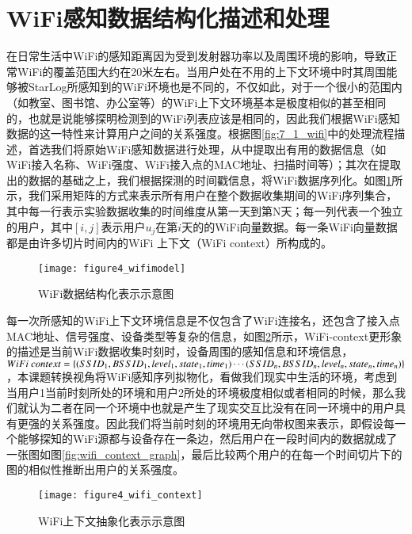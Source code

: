 \section{WiFi感知数据结构化描述和处理}
\label{wifi_pro_tec}
在日常生活中WiFi的感知距离因为受到发射器功率以及周围环境的影响，导致正常WiFi的覆盖范围大约在20米左右。当用户处在不用的上下文环境中时其周围能够被StarLog所感知到的WiFi环境也是不同的，不仅如此，对于一个很小的范围内（如教室、图书馆、办公室等）的WiFi上下文环境基本是极度相似的甚至相同的，也就是说能够探明检测到的WiFi列表应该是相同的，因此我们根据WiFi感知数据的这一特性来计算用户之间的关系强度。根据图\ref{fig:7_1_wifi}中的处理流程描述，首选我们将原始WiFi感知数据进行处理，从中提取出有用的数据信息（如WiFi接入名称、WiFi强度、WiFi接入点的MAC地址、扫描时间等）；其次在提取出的数据的基础之上，我们根据探测的时间戳信息，将WiFi数据序列化。如图\ref{fig:wifimodel_process}所示，我们采用矩阵的方式来表示所有用户在整个数据收集期间的WiFi序列集合，其中每一行表示实验数据收集的时间维度从第一天到第N天；每一列代表一个独立的用户，其中$[i,j]$表示用户$u_{j}$在第$i$天的的WiFi向量数据。每一条WiFi向量数据都是由许多切片时间内的WiFi 上下文（WiFi context）所构成的。
\begin{figure}[htp]
\centering
\texttt{[image: figure4\_wifimodel]}
\caption{WiFi数据结构化表示示意图}
\label{fig:wifimodel_process}
\end{figure}
\par 每一次所感知的WiFi上下文环境信息是不仅包含了WiFi连接名，还包含了接入点MAC地址、信号强度、设备类型等复杂的信息，如图\ref{fig:wifi_context}所示，WiFi-context更形象的描述是当前WiFi数据收集时刻时，设备周围的感知信息和环境信息， $WiFi \ context= \{ (SSID_{1},BSSID_{1},level_{1},state_{1},time_{1}) \cdots  (SSID_{n},BSSID_{n},level_{n}, \\ state_{n},time_{n}) \}$，本课题转换视角将WiFi感知序列拟物化，看做我们现实中生活的环境，考虑到当用户1当前时刻所处的环境和用户2所处的环境极度相似或者相同的时候，那么我们就认为二者在同一个环境中也就是产生了现实交互比没有在同一环境中的用户具有更强的关系强度。因此我们将当前时刻的环境用无向带权图来表示，即假设每一个能够探知的WiFi源都与设备存在一条边，然后用户在一段时间内的数据就成了一张图如图\ref{fig:wifi_context_graph}，最后比较两个用户的在每一个时间切片下的图的相似性推断出用户的关系强度。
\begin{figure}[htp]
\centering
\texttt{[image: figure4\_wifi\_context]}
\caption{WiFi上下文抽象化表示示意图}
\label{fig:wifi_context}
\end{figure}

